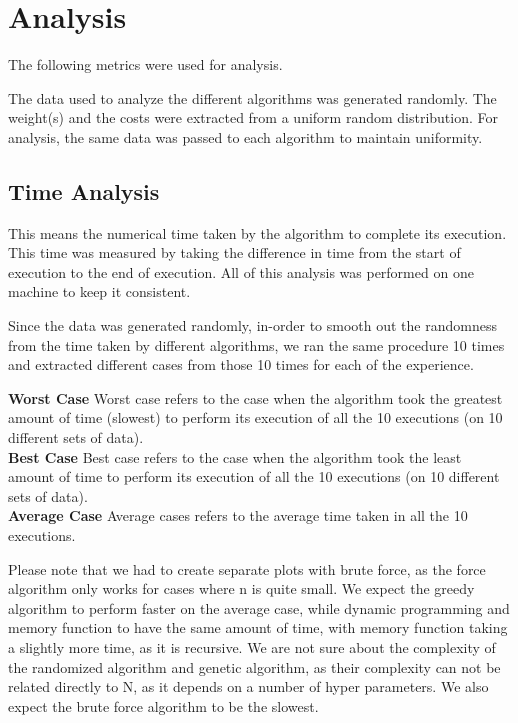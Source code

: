 \documentclass[a4paper, 11pt]{article}
\begin{document}
\section{Analysis}
The following metrics were used for analysis.

The data used to analyze the different algorithms was generated randomly. The weight(s) and the costs were extracted from a uniform random distribution. For analysis, the same data was passed to each algorithm to maintain uniformity.
\subsection{Time Analysis}
This means the numerical time taken by the algorithm to complete its execution. This time was measured by taking the difference in time from the start of execution to the end of execution. All of this analysis was performed on one machine to keep it consistent. 

Since the data was generated randomly, in-order to smooth out the randomness from the time taken by different algorithms, we ran the same procedure 10 times and extracted different cases from those 10 times for each of the experience.

\textbf{Worst Case} Worst case refers to the case when the algorithm took the greatest amount of time (slowest) to perform its execution of all the 10 executions (on 10 different sets of data).  \\
\textbf{Best Case} Best case refers to the case when the algorithm took the least amount of time to perform its execution of all the 10 executions (on 10 different sets of data).\\
\textbf{Average Case} Average cases refers to the average time taken in all the 10 executions.

Please note that we had to create separate plots with brute force, as the force algorithm only works for cases where n is quite small. We expect the greedy algorithm to perform faster on the average case, while dynamic programming and memory function to have the same amount of time, with memory function taking a slightly more time, as it is recursive. We are not sure about the complexity of the randomized algorithm and genetic algorithm, as their complexity can not be related directly to N, as it depends on a number of hyper parameters. We also expect the brute force algorithm to be the slowest.
\end{document}
